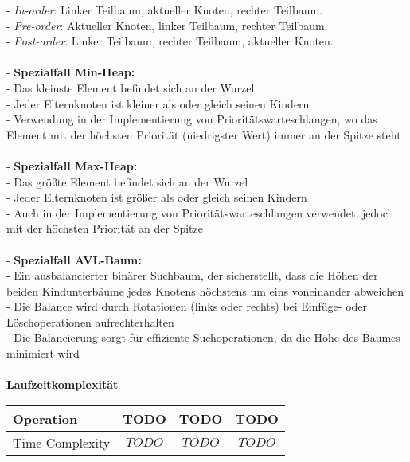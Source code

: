 \documentclass[../main.tex]{subfiles}
\begin{document}
	\quad - \textit{In-order}: Linker Teilbaum, aktueller Knoten, rechter Teilbaum.\\
	\quad - \textit{Pre-order}: Aktueller Knoten, linker Teilbaum, rechter Teilbaum.\\
	\quad - \textit{Post-order}: Linker Teilbaum, rechter Teilbaum, aktueller Knoten.\\\\
	- \textbf{Spezialfall Min-Heap:}\\
	\quad - Das kleinste Element befindet sich an der Wurzel\\
	\quad - Jeder Elternknoten ist kleiner als oder gleich seinen Kindern\\
	\quad - Verwendung in der Implementierung von Prioritätswarteschlangen, wo das Element mit der höchsten Priorität (niedrigster Wert) immer an der Spitze steht\\\\
	- \textbf{Spezialfall Max-Heap:}\\
	\quad - Das größte Element befindet sich an der Wurzel\\
	\quad - Jeder Elternknoten ist größer als oder gleich seinen Kindern\\
	\quad - Auch in der Implementierung von Prioritätswarteschlangen verwendet, jedoch mit der höchsten Priorität an der Spitze\\\\
	- \textbf{Spezialfall AVL-Baum:}\\
	\quad - Ein ausbalancierter binärer Suchbaum, der sicherstellt, dass die Höhen der beiden Kindunterbäume jedes Knotens höchstens um eins voneinander abweichen\\
	\quad - Die Balance wird durch Rotationen (links oder rechts) bei Einfüge- oder Löschoperationen aufrechterhalten\\
	\quad - Die Balancierung sorgt für effiziente Suchoperationen, da die Höhe des Baumes minimiert wird\\\\
	
	\textbf{Laufzeitkomplexität}\\
	\begin{table}[ht]
		\centering
		\begin{tabular}{l *{3}{c}}
			\toprule
			Operation & TODO & TODO & TODO\\
			\midrule
			Time Complexity & $TODO$ & $TODO$ & $TODO$\\
			\bottomrule
		\end{tabular}
	\end{table}
	\clearpage
	
\end{document}
